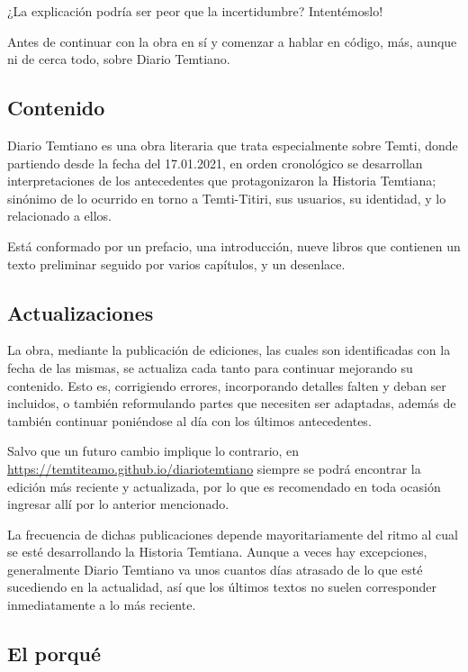 \documentclass[
  spanish,
]{book}
\begin{document}
¿La explicación podría ser peor que la incertidumbre? Intentémoslo!

Antes de continuar con la obra en sí y comenzar a hablar en código, más, aunque ni de cerca todo, sobre Diario Temtiano.

\hypertarget{contenido}{%
\subsection*{Contenido}\label{contenido}}

Diario Temtiano es una obra literaria que trata especialmente sobre Temti, donde partiendo desde la fecha del 17.01.2021, en orden cronológico se desarrollan interpretaciones de los antecedentes que protagonizaron la Historia Temtiana; sinónimo de lo ocurrido en torno a Temti-Titiri, sus usuarios, su identidad, y lo relacionado a ellos.

Está conformado por un prefacio, una introducción, nueve libros que contienen un texto preliminar seguido por varios capítulos, y un desenlace.

\hypertarget{actualizaciones}{%
\subsection*{Actualizaciones}\label{actualizaciones}}

La obra, mediante la publicación de ediciones, las cuales son identificadas con la fecha de las mismas, se actualiza cada tanto para continuar mejorando su contenido. Esto es, corrigiendo errores, incorporando detalles falten y deban ser incluidos, o también reformulando partes que necesiten ser adaptadas, además de también continuar poniéndose al día con los últimos antecedentes.

Salvo que un futuro cambio implique lo contrario, en \url{https://temtiteamo.github.io/diariotemtiano} siempre se podrá encontrar la edición más reciente y actualizada, por lo que es recomendado en toda ocasión ingresar allí por lo anterior mencionado.

La frecuencia de dichas publicaciones depende mayoritariamente del ritmo al cual se esté desarrollando la Historia Temtiana. Aunque a veces hay excepciones, generalmente Diario Temtiano va unos cuantos días atrasado de lo que esté sucediendo en la actualidad, así que los últimos textos no suelen corresponder inmediatamente a lo más reciente.

\hypertarget{el-porquuxe9}{%
\subsection*{El porqué}\label{el-porquuxe9}}
\end{document}
